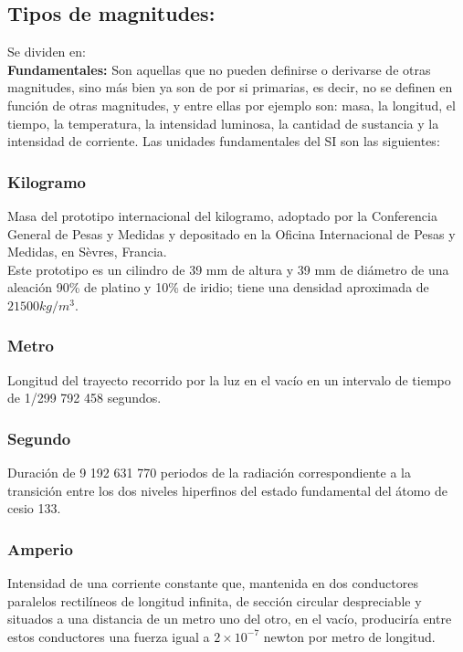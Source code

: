 \documentclass[a5paper,pagesize,10pt,bibtotoc,pointlessnumbers,
normalheadings,DIV=9,fleqn,x11names,table,twoside=false]{scrbook}
\begin{document}
\subsection{Tipos de magnitudes:}

Se dividen en:\\

\textbf{Fundamentales:} Son aquellas que no pueden definirse o derivarse de otras magnitudes, sino más bien ya son de por si 
primarias, es decir, no se definen en función de otras magnitudes, y entre ellas por ejemplo son: masa, la longitud, el tiempo, la 
temperatura, la intensidad luminosa, la cantidad de sustancia y la intensidad de corriente. Las unidades fundamentales del SI 
son las siguientes:

\subsubsection{Kilogramo}

Masa del prototipo internacional del kilogramo, adoptado por la Conferencia General de Pesas y Medidas y depositado en la Oficina 
Internacional de Pesas y Medidas, en Sèvres, Francia.\\

Este prototipo es un cilindro de 39 mm de altura y 39 mm de diámetro de una aleación 90\% de platino y 10\% de iridio; tiene 
una densidad aproximada de $21 500 kg/m^3$. 

\subsubsection{Metro}

Longitud del trayecto recorrido por la luz en el vacío en un intervalo de tiempo de 1/299 792 458 segundos.

\subsubsection{Segundo}

Duración de 9 192 631 770 periodos de la radiación correspondiente a la transición entre los dos niveles hiperfinos del estado 
fundamental del átomo de cesio 133. 

\subsubsection{Amperio}

Intensidad de una corriente constante que, mantenida en dos conductores paralelos rectilíneos de longitud infinita, de sección 
circular despreciable y situados a una distancia de un metro uno del otro, en el vacío, produciría entre estos conductores una 
fuerza igual a $2 × 10^{−7}$ newton por metro de longitud. 
\end{document}

